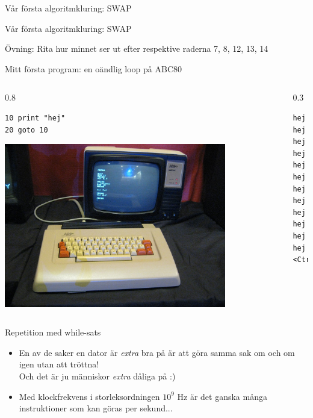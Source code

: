 \documentclass{lecturenotes}
\begin{document}
\begin{Slide}{Vår första algoritmkluring: SWAP}

\end{Slide}

\begin{Slide}{Vår första algoritmkluring: SWAP}

\footnotesize Övning: Rita hur minnet ser ut efter respektive raderna 7, 8, 12, 13, 14
\end{Slide}


\begin{Slide}{Mitt första program: en oändlig loop på ABC80}
\begin{columns}
\begin{column}{0.8\textwidth}
\begin{verbatim}
10 print "hej"
20 goto 10
\end{verbatim}
\includegraphics[width=0.8\textwidth]{img/abc80.jpg}
\end{column}
\begin{column}{0.3\textwidth}
\pause
\begin{verbatim}
hej
hej
hej
hej
hej
hej
hej
hej
hej
hej
hej
hej
<Ctrl+C>
\end{verbatim}

\end{column}
\end{columns}
\end{Slide}

\begin{Slide}{Repetition med while-sats}

\pause
\begin{itemize}
\item En av de saker en dator är \textit{extra} bra på är att göra samma sak om och om igen utan att tröttna! \\
Och det är ju människor \textit{extra} dåliga på :)
\item Med klockfrekvens i storleksordningen $10^9$ Hz är det ganska många instruktioner som kan göras per sekund...
\end{itemize}
\end{Slide}
\end{document}
